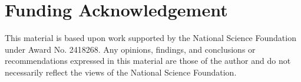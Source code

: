 \section{Funding Acknowledgement}

This material is based upon work supported by the National Science
Foundation under Award No. 2418268. Any opinions, findings, and
conclusions or recommendations expressed in this material are those of
the author and do not necessarily reflect the views of the National
Science Foundation.

